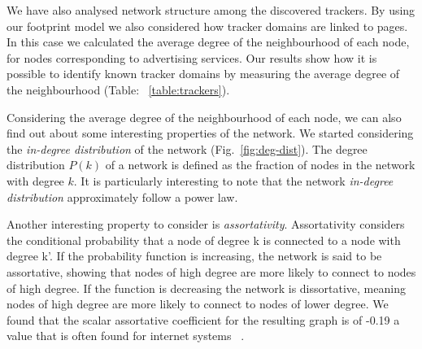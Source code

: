 We have also analysed network structure among the discovered trackers. By using our footprint model we also considered how tracker domains are linked to pages. In this case we calculated the average degree of the neighbourhood of each node, for nodes corresponding to advertising services. Our results show how it is possible to identify known tracker domains by measuring the average degree of the neighbourhood (Table: ~\ref{table:trackers}).

Considering the average degree of the neighbourhood of each node, we can also find out about some interesting properties of the network. We started considering the \emph{in-degree distribution} of the network (Fig.~\ref{fig:deg-dist}). The degree distribution $P(k)$ of a network is defined as the fraction of nodes in the network with degree $k$. It is particularly interesting to note that the network \emph{in-degree distribution} approximately follow a power law.

Another interesting property to consider is \emph{assortativity}. Assortativity considers the conditional probability that a node of degree k is connected to a node with degree k'. If the probability function is increasing, the network is said to be assortative, showing that nodes of high degree are more likely to connect to nodes of high degree. If the function is decreasing the network is dissortative, meaning nodes of high degree are more likely to connect to nodes of lower degree. We found that the scalar assortative coefficient for the resulting graph is of -0.19 a value that is often found for internet systems ~\cite{noldus2015assortativity}.

